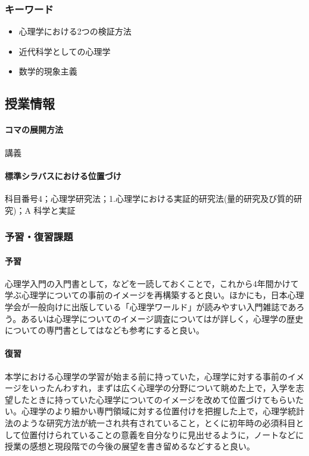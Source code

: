 \subsubsection{キーワード}
\begin{itemize}
	\item 心理学における2つの検証方法
	\item 近代科学としての心理学
	\item 数学的現象主義
\end{itemize}
\subsection{授業情報}
\paragraph{コマの展開方法}
講義
\paragraph{標準シラバスにおける位置づけ}
科目番号4；心理学研究法；1.心理学における実証的研究法(量的研究及び質的研究)；A 科学と実証
\subsubsection{予習・復習課題}
\paragraph{予習}
心理学入門の入門書として，\textcite{Daihiko201507,Michimata200903}などを一読しておくことで，これから4年間かけて学ぶ心理学についての事前のイメージを再構築すると良い。ほかにも，日本心理学会が一般向けに出版している「心理学ワールド」が読みやすい入門雑誌であろう。あるいは心理学についてのイメージ調査については\textcite{Kikuchi2018}が詳しく，心理学の歴史についての専門書としては\textcite{Ohashi201610}なども参考にすると良い。
\paragraph{復習}
本学における心理学の学習が始まる前に持っていた，心理学に対する事前のイメージをいったんわすれ，まずは広く心理学の分野について眺めた上で，入学を志望したときに持っていた心理学についてのイメージを改めて位置づけてもらいたい。心理学のより細かい専門領域に対する位置付けを把握した上で，心理学統計法のような研究方法が統一され共有されていること，とくに初年時の必須科目として位置付けられていることの意義を自分なりに見出せるように，ノートなどに授業の感想と現段階での今後の展望を書き留めるなどすると良い。
